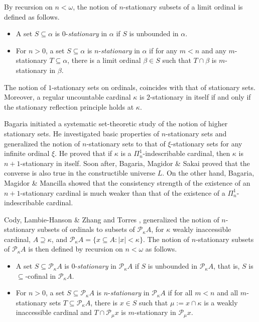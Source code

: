 \documentclass[a4paper,12pt,reqno,oneside]{amsart}
\theoremstyle{plain}
\newcommand{\mcal}{\mathcal}
\begin{document}
By recursion on $n < \omega$, the notion of $n$-stationary subsets of a limit ordinal is defined as follows.
\begin{itemize}
\item A set $S \subseteq \alpha$ is $0$-\emph{stationary} in $\alpha$ if $S$ is unbounded in $\alpha$.
\item For $n > 0$, a set $S \subseteq \alpha$ is $n$-\emph{stationary} in $\alpha$ if for any $m<n$ and any $m$-stationary $T \subseteq \alpha$, there is a limit ordinal $\beta \in S$ such that $T \cap \beta$ is $m$-stationary in $\beta$.
\end{itemize}

The notion of $1$-stationary sets on ordinals, coincides with that of stationary sets. Moreover, a regular uncountable cardinal $\kappa$ is $2$-stationary in itself if and only if the stationary reflection principle holds at $\kappa$.

Bagaria \cite{B} initiated a systematic set-theoretic study of the notion of higher stationary sets. He investigated basic properties of $n$-stationary sets and generalized the notion of $n$-stationary sets to that of $\xi$-stationary sets for any infinite ordinal $\xi$. He proved that if $\kappa$ is a $\Pi^1_n$-indescribable cardinal, then $\kappa$ is $n+1$-stationary in itself. Soon after,  Bagaria, Magidor \& Sakai \cite{BMS} proved that the converse is also true in the constructible universe $L$. On the other hand, Bagaria, Magidor \& Mancilla \cite{BMM} showed that the consistency strength of the existence of an $n+1$-stationary cardinal is much weaker than that of the existence of a $\Pi^1_n$-indescribable cardinal.

Cody, Lambie-Hanson \& Zhang \cite{CLHZ} and Torres \cite{T}, generalized the notion of $n$-stationary subsets of ordinals to subsets of $\mcal{P}_\kappa A$, for $\kappa$ weakly inaccessible cardinal, $A \supseteq \kappa$, and $\mcal{P}_\kappa A = \{ x \subseteq A : |x| < \kappa \}$. The notion of $n$-stationary subsets of $\mcal{P}_\kappa A$ is then defined by recursion on $n < \omega$ as follows.
\begin{itemize}
\item A set $S\subseteq \mcal{P}_{\kappa}{A}$ is $0$-\emph{stationary} in $\mcal{P}_{\kappa}{A}$ if $S$ is unbounded in $\mcal{P}_{\kappa}{A}$, that is, $S$ is $\subseteq$-cofinal in $\mcal{P}_\kappa A$.
\item For $n > 0$, a set $S\subseteq \mcal{P}_{\kappa}{A}$ is $n$-\emph{stationary} in $\mcal{P}_{\kappa}{A}$ if for all $m<n$ and all $m$-stationary sets $T \subseteq \mcal{P}_{\kappa}{A}$, there is $x \in S$ such that $\mu := x \cap \kappa$ is a weakly inaccessible cardinal and $T\cap \mcal{P}_{\mu}{x}$ is $m$-stationary in $\mcal{P}_{\mu}{x}$.
\end{itemize}
\end{document}

